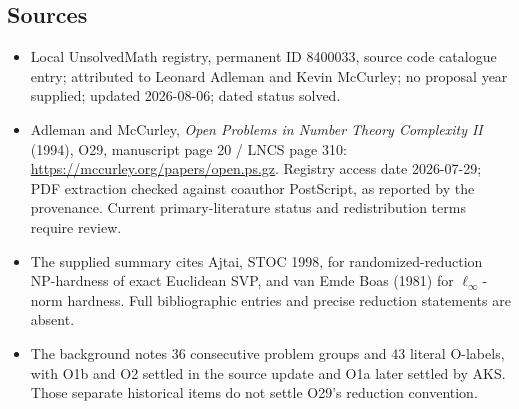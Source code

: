 \documentclass[11pt]{article}
\begin{document}
\subsection{Sources}
\begin{itemize}
\item Local UnsolvedMath registry, permanent ID 8400033, source code catalogue entry; attributed to Leonard Adleman and Kevin McCurley; no proposal year supplied; updated 2026-08-06; dated status solved.
\item Adleman and McCurley, \emph{Open Problems in Number Theory Complexity II} (1994), O29, manuscript page 20 / LNCS page 310: \url{https://mccurley.org/papers/open.ps.gz}. Registry access date 2026-07-29; PDF extraction checked against coauthor PostScript, as reported by the provenance. Current primary-literature status and redistribution terms require review.
\item The supplied summary cites Ajtai, STOC 1998, for randomized-reduction NP-hardness of exact Euclidean SVP, and van Emde Boas (1981) for \(\ell_\infty\)-norm hardness. Full bibliographic entries and precise reduction statements are absent.
\item The background notes 36 consecutive problem groups and 43 literal O-labels, with O1b and O2 settled in the source update and O1a later settled by AKS. Those separate historical items do not settle O29's reduction convention.
\end{itemize}
\end{document}
